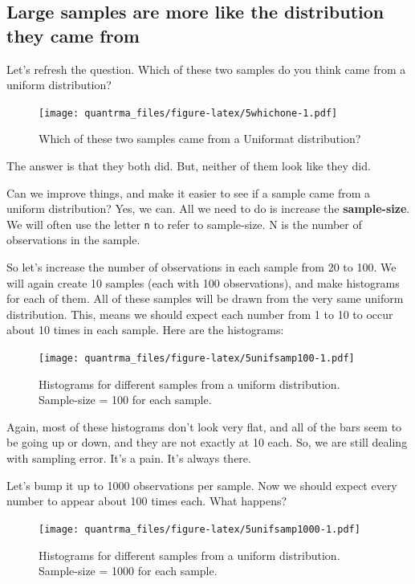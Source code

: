 \documentclass[
]{book}
\begin{document}
\hypertarget{large-samples-are-more-like-the-distribution-they-came-from}{%
\subsection{Large samples are more like the distribution they came from}\label{large-samples-are-more-like-the-distribution-they-came-from}}

Let's refresh the question. Which of these two samples do you think came from a uniform distribution?

\begin{figure}
\centering
\texttt{[image: quantrma\_files/figure-latex/5whichone-1.pdf]}
\caption{\label{fig:5whichone}Which of these two samples came from a Uniformat distribution?}
\end{figure}

The answer is that they both did. But, neither of them look like they did.

Can we improve things, and make it easier to see if a sample came from a uniform distribution? Yes, we can. All we need to do is increase the \textbf{sample-size}. We will often use the letter \texttt{n} to refer to sample-size. N is the number of observations in the sample.

So let's increase the number of observations in each sample from 20 to 100. We will again create 10 samples (each with 100 observations), and make histograms for each of them. All of these samples will be drawn from the very same uniform distribution. This, means we should expect each number from 1 to 10 to occur about 10 times in each sample. Here are the histograms:

\begin{figure}
\centering
\texttt{[image: quantrma\_files/figure-latex/5unifsamp100-1.pdf]}
\caption{\label{fig:5unifsamp100}Histograms for different samples from a uniform distribution. Sample-size = 100 for each sample.}
\end{figure}

Again, most of these histograms don't look very flat, and all of the bars seem to be going up or down, and they are not exactly at 10 each. So, we are still dealing with sampling error. It's a pain. It's always there.

Let's bump it up to 1000 observations per sample. Now we should expect every number to appear about 100 times each. What happens?

\begin{figure}
\centering
\texttt{[image: quantrma\_files/figure-latex/5unifsamp1000-1.pdf]}
\caption{\label{fig:5unifsamp1000}Histograms for different samples from a uniform distribution. Sample-size = 1000 for each sample.}
\end{figure}
\end{document}
